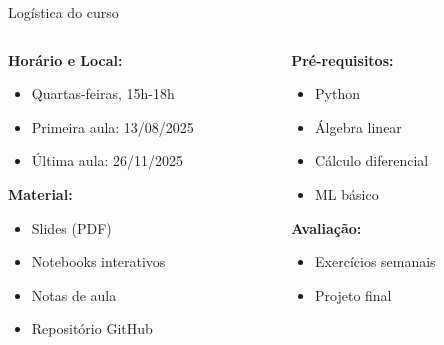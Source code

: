 \documentclass[xcolor=dvipsnames,t,aspectratio=169]{beamer} %
\begin{document}
\begin{frame}[c]{Logística do curso}
    \begin{columns}[c]
        \begin{column}{0.5\textwidth}
            \textbf{Horário e Local:}
            \begin{itemize}
                \item Quartas-feiras, 15h-18h
                \item Primeira aula: 13/08/2025
                \item Última aula: 26/11/2025
            \end{itemize}
            
            \textbf{Material:}
            \begin{itemize}
                \item Slides (PDF)
                \item Notebooks interativos
                \item Notas de aula
                \item Repositório GitHub
            \end{itemize}
        \end{column}
        \begin{column}{0.5\textwidth}
            \textbf{Pré-requisitos:}
            \begin{itemize}
                \item Python
                \item Álgebra linear
                \item Cálculo diferencial
                \item ML básico 
            \end{itemize}
            
            \textbf{Avaliação:}
            \begin{itemize}
                \item Exercícios semanais
                \item Projeto final 
            \end{itemize}
        \end{column}
    \end{columns}
\end{frame}
\end{document}
